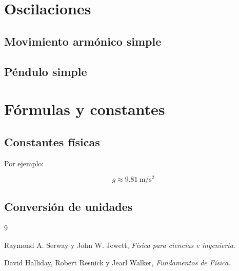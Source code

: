 \documentclass[12pt,oneside]{book}
\begin{document}
\chapter{Oscilaciones}

\section{Movimiento armónico simple}

\section{Péndulo simple}


\appendix

\chapter{Fórmulas y constantes}

\section{Constantes físicas}

Por ejemplo:

\[
    g \approx \SI{9.81}{\meter\per\second\squared}
\]

\section{Conversión de unidades}


\begin{thebibliography}{9}

Raymond A. Serway y John W. Jewett,
\textit{Física para ciencias e ingeniería}.

David Halliday, Robert Resnick y Jearl Walker,
\textit{Fundamentos de Física}.

\end{thebibliography}
\end{document}
